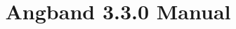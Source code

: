 \documentclass[a4paper]{article}
\begin{document}
\title{Angband 3.3.0 Manual}
\maketitle
\tableofcontents











\printindex
\end{document}
